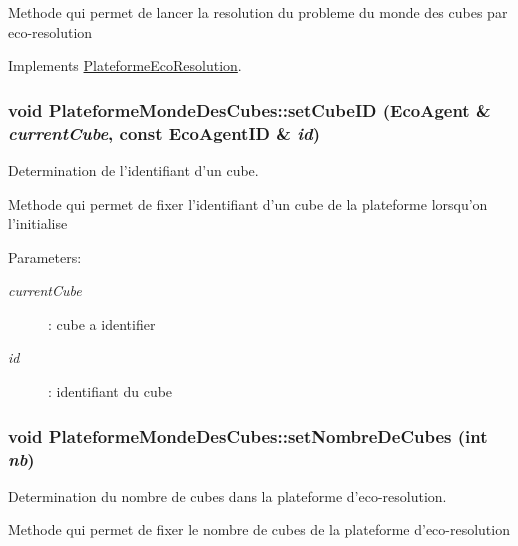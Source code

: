 Methode qui permet de lancer la resolution du probleme du monde des cubes par eco-resolution 

Implements \hyperlink{classPlateformeEcoResolution_17f587580cd8aee537551bc0ddd82bef}{PlateformeEcoResolution}.\hypertarget{classPlateformeMondeDesCubes_c99c6db4dfc2b193d8697103bec3d4d4}{
\subsubsection[{setCubeID}]{\setlength{\rightskip}{0pt plus 5cm}void PlateformeMondeDesCubes::setCubeID ({\bf EcoAgent} \& {\em currentCube}, \/  const {\bf EcoAgentID} \& {\em id})}}
\label{classPlateformeMondeDesCubes_c99c6db4dfc2b193d8697103bec3d4d4}


Determination de l'identifiant d'un cube. 

Methode qui permet de fixer l'identifiant d'un cube de la plateforme lorsqu'on l'initialise

\begin{Desc}
\item[Parameters:]
\begin{description}
\item[{\em currentCube}]: cube a identifier \item[{\em id}]: identifiant du cube \end{description}
\end{Desc}
\hypertarget{classPlateformeMondeDesCubes_e519331088db520a76d1ead67a382c48}{
\subsubsection[{setNombreDeCubes}]{\setlength{\rightskip}{0pt plus 5cm}void PlateformeMondeDesCubes::setNombreDeCubes (int {\em nb})}}
\label{classPlateformeMondeDesCubes_e519331088db520a76d1ead67a382c48}


Determination du nombre de cubes dans la plateforme d'eco-resolution. 

Methode qui permet de fixer le nombre de cubes de la plateforme d'eco-resolution

